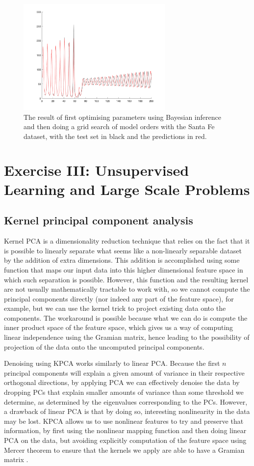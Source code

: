 \documentclass[10pt,a4paper]{article}
\begin{document}
\begin{figure}[h!]
\centering
  \includegraphics[width=3in]{order50Santa.png}
  \caption{The result of first optimising parameters using Bayesian inference and then doing a grid search of model orders with the Santa Fe dataset, with the test set in black and the predictions in red.}
  \label{fig:order50Santa}
\end{figure}

\section{Exercise III: Unsupervised Learning and Large Scale Problems}
\subsection{Kernel principal component analysis}
Kernel PCA is a dimensionality reduction technique that relies on the fact that it is possible to linearly separate what seems like a non-linearly separable dataset by the addition of extra dimensions. This addition is accomplished using some function that maps our input data into this higher dimensional feature space in which such separation is possible. However, this function and the resulting kernel are not usually mathematically tractable to work with, so we cannot compute the principal components directly (nor indeed any part of the feature space), for example, but we can use the kernel trick to project existing data onto the components. The workaround is possible because what we can do is compute the inner product space of the feature space, which gives us a way of computing linear independence using the Gramian matrix, hence leading to the possibility of projection of the data onto the uncomputed principal components.

Denoising using KPCA works similarly to linear PCA. Because the first $n$ principal components will explain a given amount of variance in their respective orthogonal directions, by applying PCA we can effectively denoise the data by dropping PCs that explain smaller amounts of variance than some threshold we determine, as determined by the eigenvalues corresponding to the PCs. However, a drawback of linear PCA is that by doing so, interesting nonlinearity in the data may be lost. KPCA allows us to use nonlinear features to try and preserve that information, by first using the nonlinear mapping function and then doing linear PCA on the data, but avoiding explicitly computation of the feature space using Mercer theorem to ensure that the kernels we apply are able to have a Gramian matrix \cite{mikaKernelPCADeNoising}.
\end{document}
